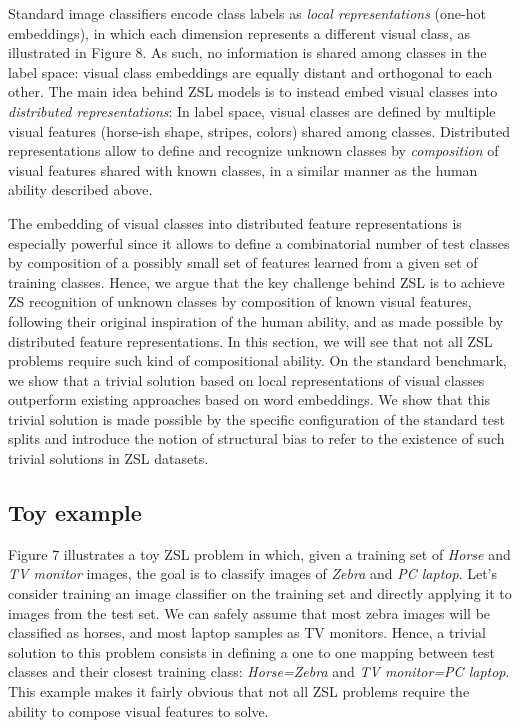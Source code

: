 Standard image classifiers encode class labels as \textit{local representations} (one-hot embeddings), 
in which each dimension represents a different visual class, as illustrated in Figure 8. 
As such, no information is shared among classes in the label space:
visual class embeddings are equally distant and orthogonal to each other.
The main idea behind ZSL models is to instead embed visual classes into \textit{distributed representations}:
In label space, visual classes are defined by multiple visual features (horse-ish shape, stripes, colors) shared among classes.
Distributed representations allow to define and recognize unknown classes 
by \textit{composition} of visual features shared with known classes,
in a similar manner as the human ability described above.

The embedding of visual classes into distributed feature representations is especially powerful 
since it allows to define a combinatorial number of test classes by composition of a possibly 
small set of features learned from a given set of training classes.
Hence, we argue that the key challenge behind ZSL is to achieve ZS recognition of unknown classes 
by composition of known visual features, following their original inspiration of the human ability, 
and as made possible by distributed feature representations. %
In this section, we will see that not all ZSL problems require such kind of compositional ability.
On the standard benchmark, we show that a trivial solution based on local 
representations of visual classes outperform existing approaches based on word embeddings.
We show that this trivial solution is made possible by the specific configuration of the standard test splits
and introduce the notion of structural bias to refer to the existence of such trivial solutions in ZSL datasets.

\subsection{Toy example}

Figure 7 illustrates a toy ZSL problem in which,
given a training set of \textit{Horse} and \textit{TV monitor} images, 
the goal is to classify images of \textit{Zebra} and \textit{PC laptop}.
Let's consider training an image classifier on the training set and directly applying it to images from the test set.
We can safely assume that most zebra images will be classified as horses, and most laptop samples as TV monitors.
Hence, a trivial solution to this problem consists in defining a one to one mapping between test classes and their closest training class: 
\textit{Horse=Zebra} and \textit{TV monitor=PC laptop}.
This example makes it fairly obvious that not all ZSL problems require the ability to compose visual features to solve. 

